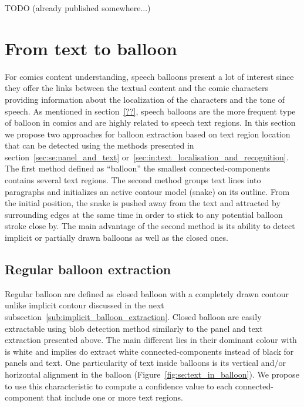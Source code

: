 TODO (already published somewhere...) 



\section{From text to balloon} %
\label{sec:se:from_text_to_balloon}
For comics content understanding, speech balloons present a lot of interest since they offer the links between the textual content and the comic characters providing information about the localization of the characters and the tone of speech. 
As mentioned in section~\ref{??}, speech balloons are the more frequent type of balloon in comics and are highly related to speech text regions.
In this section we propose two approaches for balloon extraction based on text region location that can be detected using the methods presented in section~\ref{sec:se:panel_and_text} or~\ref{sec:in:text_localisation_and_recognition}.
The first method defined as ``balloon'' the smallest connected-components contains several text regions.
The second method groups text lines into paragraphs and initializes an active contour model (snake) on its outline.
From the initial position, the snake is pushed away from the text and attracted by surrounding edges at the same time in order to stick to any potential balloon stroke close by.
The main advantage of the second method is its ability to detect implicit or partially drawn balloons as well as the closed ones.

\subsection{Regular balloon extraction} %
\label{sub:se:regular_balloon_extraction}
Regular balloon are defined as closed balloon with a completely drawn contour unlike implicit contour discussed in the next subsection~\ref{sub:implicit_balloon_extraction}.
Closed balloon are easily extractable using blob detection method similarly to the panel and text extraction presented above.
The main different lies in their dominant colour with is white and implies do extract white connected-components instead of black for panels and text.
One particularity of text inside balloons is its vertical and/or horizontal alignment in the balloon (Figure~\ref{fig:se:text_in_balloon}).
We propose to use this characteristic to compute a confidence value to each connected-component that include one or more text regions.

